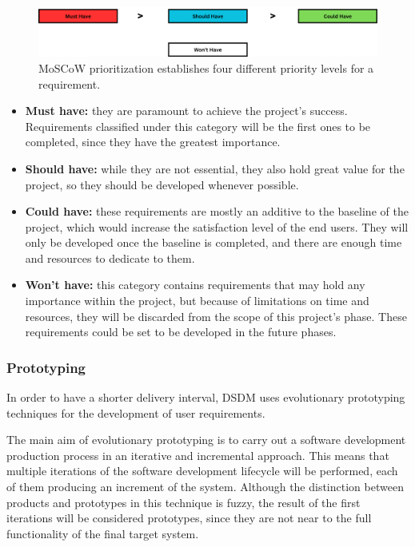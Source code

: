 \begin{figure}[H]
    \centering
    \includegraphics[width=0.8\linewidth]{figs/MosCow.png}
    \caption{MoSCoW prioritization establishes four different priority levels for a requirement.}
    \label{fig:MoSCoW}
\end{figure}

\begin{itemize}
    \item \textbf{Must have: }they are paramount to achieve the project's success. Requirements classified under this category will be the first ones to be completed, since
    they have the greatest importance.

    \item \textbf{Should have: }while they are not essential, they also hold great value for the project, so they should be developed whenever possible.
    
    \item \textbf{Could have: }these requirements are mostly an additive to the baseline of the project, which would increase the satisfaction level of the end users. They will
    only be developed once the baseline is completed, and there are enough time and resources to dedicate to them.

    \item \textbf{Won't have: }this category contains requirements that may hold any importance within the project, but because of limitations on time and resources,
    they will be discarded from the scope of this project's phase. These requirements could be set to be developed in the future phases.
\end{itemize}


\subsubsection{Prototyping}\label{sec:prototyping}

In order to have a shorter delivery interval, \acrshort{DSDM} uses evolutionary prototyping techniques for the development of user requirements.

The main aim of evolutionary prototyping is to carry out a software development production process in an iterative and incremental approach. This means that multiple iterations
of the software development lifecycle will be performed, each of them producing an increment of the system. Although the distinction between products and prototypes in this technique
is fuzzy, the result of the first iterations will be considered prototypes, since they are not near to the full functionality of the final target system\cite{prototyping}.


